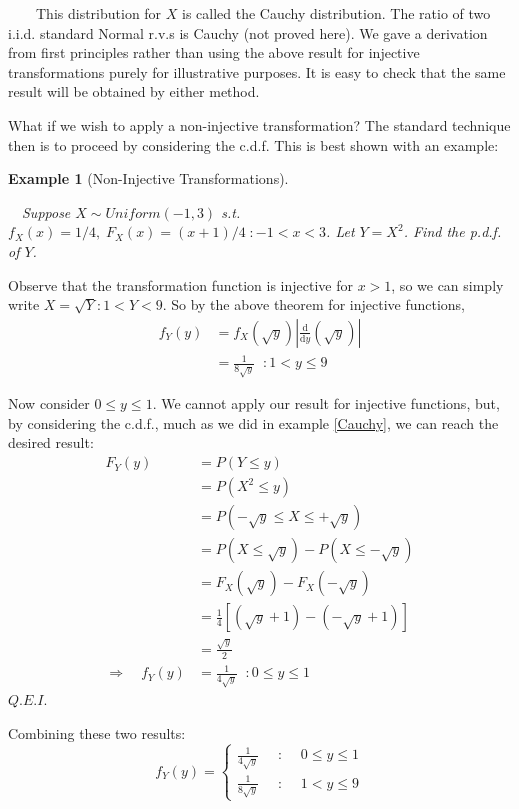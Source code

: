 \documentclass[12pt,a4paper]{article}
\newtheorem{ex}[thm]{Example}
\begin{document}
$\qquad$This distribution for $X$ is called the Cauchy distribution. The ratio of two i.i.d. standard Normal r.v.s is Cauchy (not proved here). We gave a derivation from first principles rather than using the above result for injective transformations purely for illustrative purposes. It is easy to check that the same result will be obtained by either method.

What if we wish to apply a non-injective transformation? The standard technique then is to proceed by considering the c.d.f. This is best shown with an example:

\begin{ex}[Non-Injective Transformations]$\;$\par

$\quad$Suppose $X \sim Uniform(-1, 3)$ s.t. $f_X(x) = 1/4, \; F_X(x) = (x + 1)/4 \; : -1 < x < 3$. Let $Y = X^2$. Find the p.d.f. of $Y$.
\end{ex}

Observe that the transformation function is injective for $x > 1$, so we can simply write $X = \sqrt Y : 1 < Y < 9$. So by the above theorem for injective functions,
\begin{align*}
f_Y(y) &= f_X(\sqrt y) \left| \frac{\mathrm{d}}{\mathrm{d}y}(\sqrt y) \right|\\
&= \frac{1}{8 \sqrt y} \;\; : 1 < y \leq 9
\end{align*}

Now consider $0 \leq y \leq 1$. We cannot apply our result for injective functions, but, by considering the c.d.f., much as we did in example \ref{Cauchy}, we can reach the desired result:
\begin{align*}
F_Y(y) &= P(Y \leq y)\\
&= P(X^2 \leq y)\\
&= P(-\sqrt y \leq X \leq +\sqrt y)\\
&= P(X \leq \sqrt y) - P(X \leq -\sqrt y)\\
&= F_X(\sqrt y) - F_X(- \sqrt y)\\
&= \frac{1}{4}[(\sqrt y + 1) - (-\sqrt y + 1)]\\
&= \frac{\sqrt y}{2}\\
\Rightarrow\quad f_Y(y) &= \frac{1}{4 \sqrt y} \; \; : 0 \leq y \leq 1
\end{align*}\hfill $Q.E.I.$

\noindent Combining these two results:
$$f_Y(y) = \left\{ \begin{array}{ccl} \frac{1}{4 \sqrt y} \;\; &: \;\; &0 \leq y \leq 1\\ \frac{1}{8 \sqrt y} \;\; &: \;\; &1 < y \leq 9 \end{array}\right.$$
\end{document}
